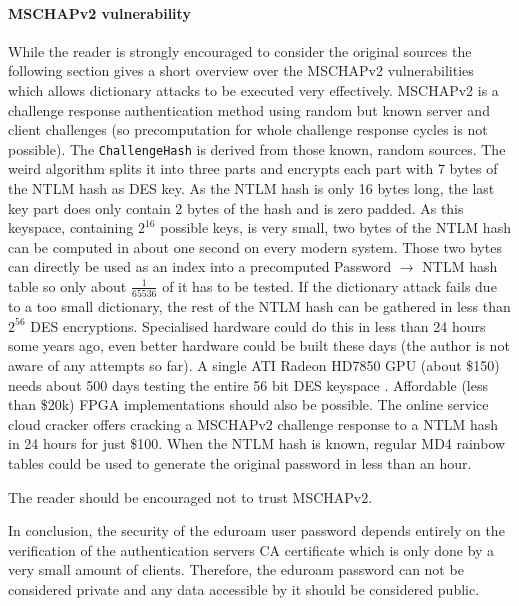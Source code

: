 \documentclass[12pt,a4paper]{scrartcl}
\begin{document}
\paragraph{MSCHAPv2 vulnerability}
While the reader is strongly encouraged to consider the original sources the following section gives a short overview over the MSCHAPv2 vulnerabilities which allows dictionary attacks to be executed very effectively.
MSCHAPv2 is a challenge response authentication method using random but known server and client challenges (so precomputation for whole challenge response cycles is not possible).
The \texttt{ChallengeHash} is derived from those known, random sources.
The weird algorithm splits it into three parts and encrypts each part with 7 bytes of the NTLM hash as DES key.
As the NTLM hash is only 16 bytes long, the last key part does only contain 2 bytes of the hash and is zero padded.
As this keyspace, containing $2^{16}$ possible keys, is very small, two bytes of the NTLM hash can be computed in about one second on every modern system.
Those two bytes can directly be used as an index into a precomputed Password $\rightarrow$ NTLM hash table so only about $\frac{1}{65536}$ of it has to be tested.
If the dictionary attack fails due to a too small dictionary, the rest of the NTLM hash can be gathered in less than $2^{56}$ DES encryptions.
Specialised hardware could do this in less than 24 hours some years ago, even better hardware could be built these days (the author is not aware of any attempts so far).
A single ATI Radeon HD7850 GPU (about \$150) needs about 500 days testing the entire 56 bit DES keyspace \cite{des-gpu}.
Affordable (less than \$20k) FPGA implementations should also be possible.
The online service cloud cracker offers cracking a MSCHAPv2 challenge response to a NTLM hash in 24 hours for just \$100.
When the NTLM hash is known, regular MD4 rainbow tables could be used to generate the original password in less than an hour.

The reader should be encouraged not to trust MSCHAPv2.

In conclusion, the security of the eduroam user password depends entirely on the verification of the authentication servers CA certificate which is only done by a very small amount of clients.
Therefore, the eduroam password can not be considered private and any data accessible by it should be considered public.
\end{document}
